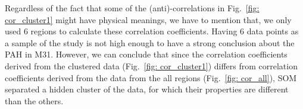         
        
       Regardless of the fact that some of the (anti)-correlations in Fig.~\ref{fig: cor_cluster1} might have physical meanings, we have to mention that, we only used 6 regions to calculate these correlation coefficients.
       Having 6 data points as a sample of the study is not high enough to have a strong conclusion about the PAH in M31.%
        However, we can conclude that since the correlation coefficients derived from the clustered data (Fig.~\ref{fig: cor_cluster1}) differs from correlation coefficients derived from the data from the all regions (Fig.~\ref{fig: cor_all}), SOM separated a hidden cluster of the data, for which their properties are different than the others. %
        
        
        
        
        
